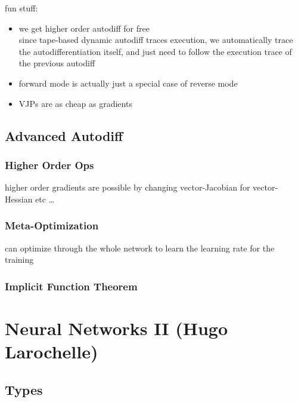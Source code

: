 \documentclass[]{article}
\theoremstyle{definition}
\begin{document}
    fun stuff:
    \begin{itemize}
        \item we get higher order autodiff for free \\
            since tape-based dynamic autodiff traces execution, we automatically trace the autodifferentiation itself,
            and just need to follow the execution trace of the previous autodiff
        \item forward mode is actually just a special case of reverse mode
        \item VJPs are as cheap as gradients
    \end{itemize}

    \subsection{Advanced Autodiff}%
    \label{sub:advanced_autodiff}

    \subsubsection{Higher Order Ops}%
    \label{ssub:higher_order_ops}

    higher order gradients are possible by changing vector-Jacobian for vector-Hessian etc \ldots

    \subsubsection{Meta-Optimization}%
    \label{ssub:meta_optimization}

    can optimize through the whole network to learn the learning rate for the training

    \subsubsection{Implicit Function Theorem}%
    \label{ssub:implicit_function_theorem}



    \section{Neural Networks II {\small(Hugo Larochelle)}}%
    \label{sec:neural_networks_ii_small_hugo_larochelle_}

    \subsection{Types}%
    \label{sub:types}
\end{document}
